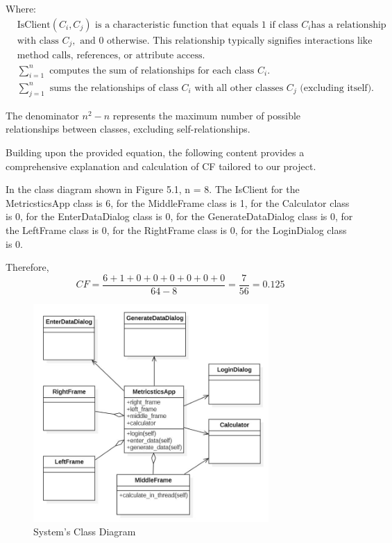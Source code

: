 \documentclass[english,12pt,a4paper]{report}
\begin{document}
	Where:
	\begin{align*}
		& \text{IsClient}(C_i, C_j) \text{ is a characteristic function that equals 1 if class } C_i \text{has a relationship}\\
		& \text{with class } C_j, \text{ and 0 otherwise. This relationship typically signifies interactions like} \\
		& \text{method calls, references, or attribute access.} \\
		& \sum_{i=1}^{n} \text{ computes the sum of relationships for each class } C_i. \\
		& \sum_{j=1}^{n} \text{ sums the relationships of class } C_i \text{ with all other classes } C_j \text{ (excluding itself).}
	\end{align*}
	
	The denominator \(n^2 - n\) represents the maximum number of possible relationships between classes, excluding self-relationships.
	
	\vspace{10pt}
	Building upon the provided equation, the following content provides a comprehensive explanation and calculation of CF tailored to our  project. 
	
	\vspace{10pt}
	In the class diagram shown in Figure 5.1, n = 8. The IsClient for the MetricsticsApp class is 6, for the MiddleFrame class is 1, for the Calculator class is 0, for the EnterDataDialog class is 0,  for the GenerateDataDialog class is 0,  for the LeftFrame class is 0,  for the RightFrame class is 0, for the LoginDialog class is 0.
	
	\vspace{10pt}
	Therefore,
	\begin{equation}
		CF = \frac{6 + 1 + 0 + 0 + 0 + 0 + 0 + 0}{64 - 8} = \frac{7}{56} = 0.125
		\tag{Equation 19}
	\end{equation}
	
	\begin{figure}[h]
		\centering
		\includegraphics[width=0.8\textwidth]{images/uml.jpg}
		\caption{System's Class Diagram}
		\label{fig:System's Class Diagram}
	\end{figure}
	
\end{document}
